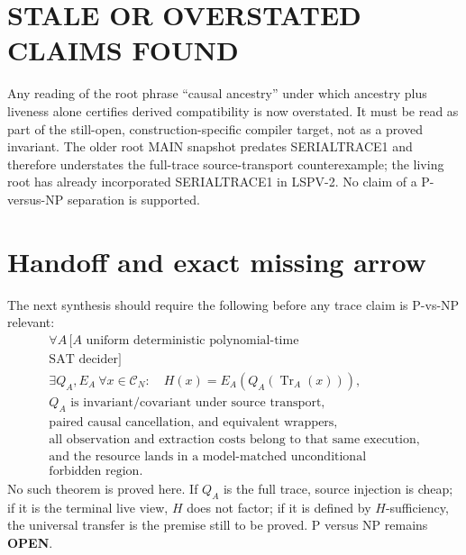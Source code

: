\documentclass[11pt]{article}
\newcommand{\OPEN}{\textbf{OPEN}}
\begin{document}
\section{STALE OR OVERSTATED CLAIMS FOUND}
Any reading of the root phrase ``causal ancestry'' under which ancestry plus
liveness alone certifies derived compatibility is now overstated.  It must be
read as part of the still-open, construction-specific compiler target, not as
a proved invariant.  The older root MAIN snapshot predates SERIALTRACE1 and
therefore understates the full-trace source-transport counterexample; the
living root has already incorporated SERIALTRACE1 in LSPV-2.  No claim of a
P-versus-NP separation is supported.

\section{Handoff and exact missing arrow}
The next synthesis should require the following before any trace claim is
P-vs-NP relevant:
\[
 \boxed{
 \begin{gathered}
 \forall A\,[A\text{ uniform deterministic polynomial-time}\\
 \text{SAT decider}]\\
 \exists Q_A,E_A\ \forall x\in\mathcal C_N:\quad
 H(x)=E_A(Q_A(\operatorname{Tr}_A(x))),\\
 Q_A\text{ is invariant/covariant under source transport,}\\
 \text{paired causal cancellation, and equivalent wrappers,}\\
 \text{all observation and extraction costs belong to that same execution,}\\
 \text{and the resource lands in a model-matched unconditional}\\
 \text{forbidden region.}
 \end{gathered}}
\]
No such theorem is proved here.  If $Q_A$ is the full trace, source injection
is cheap; if it is the terminal live view, $H$ does not factor; if it is
defined by $H$-sufficiency, the universal transfer is the premise still to be
proved.  P versus NP remains \OPEN.
\end{document}
